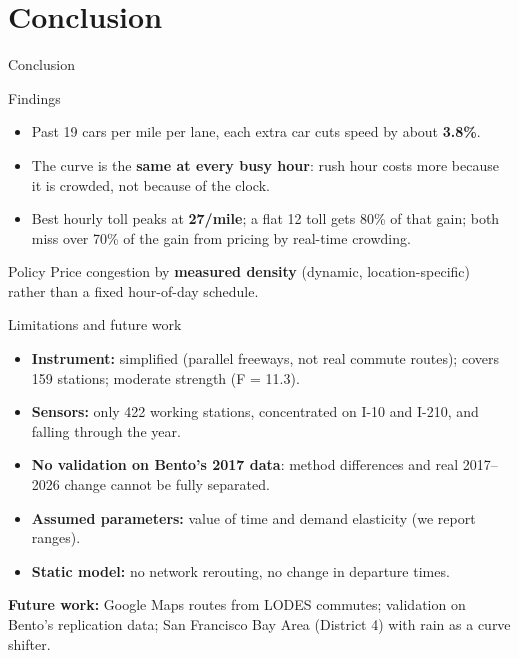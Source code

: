 \documentclass[compress]{beamer}
\newcommand{\hl}[1]{{\color{IITRBlue}\textbf{#1}}}
\begin{document}
\section{Conclusion}
\begin{frame}[t]{Conclusion}
\begin{block}{Findings}
\begin{itemize}
\item Past 19 cars per mile per lane, each extra car cuts speed by about \hl{3.8\%}.
\item The curve is the \hl{same at every busy hour}: rush hour costs more because it is crowded, not because of the clock.
\item Best hourly toll peaks at \hl{27\textcent/mile}; a flat 12\textcent{} toll gets 80\% of that gain; both miss over 70\% of the gain from pricing by real-time crowding.
\end{itemize}
\end{block}
\begin{block}{Policy}
Price congestion by \hl{measured density} (dynamic, location-specific) rather than a fixed hour-of-day schedule.
\end{block}
\end{frame}

\begin{frame}[t]{Limitations and future work}
\small
\begin{itemize}
\item \textbf{Instrument:} simplified (parallel freeways, not real commute routes); covers 159 stations; moderate strength (F = 11.3).
\item \textbf{Sensors:} only 422 working stations, concentrated on I-10 and I-210, and falling through the year.
\item \textbf{No validation on Bento's 2017 data}: method differences and real 2017--2026 change cannot be fully separated.
\item \textbf{Assumed parameters:} value of time and demand elasticity (we report ranges).
\item \textbf{Static model:} no network rerouting, no change in departure times.
\end{itemize}
\vspace{0.3em}
\textbf{Future work:} Google Maps routes from LODES commutes; validation on Bento's replication data; San Francisco Bay Area (District 4) with rain as a curve shifter.
\end{frame}
\end{document}
